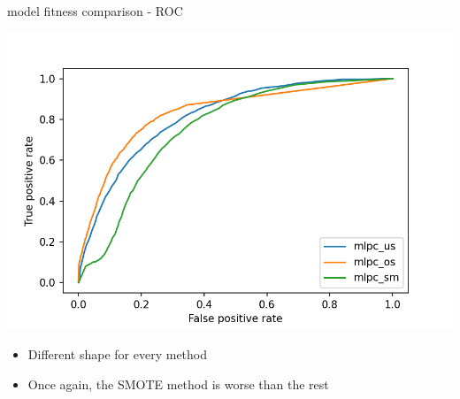 \documentclass{beamer}
\begin{document}
\begin{frame}{model fitness comparison - ROC}

\begin{center}
\includegraphics[scale=0.55]{img/mlpc_roc.png}
\end{center}

\begin{itemize}
\item Different shape for every method
\item Once again, the SMOTE method is worse than the rest
\end{itemize}

\end{frame}
\end{document}
